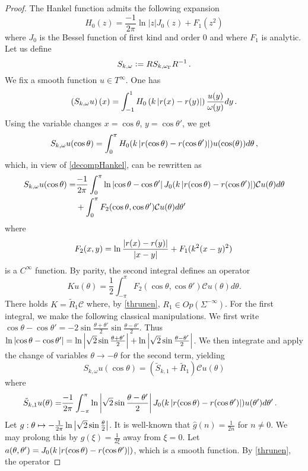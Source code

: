\documentclass[a4paper]{article}
\begin{document}
\begin{proof}
	The Hankel function admits the following expansion
	\begin{equation}
	\label{decompHankel}
	H_0(z) = \frac{-1}{2\pi}\ln|z| J_0(z) + F_1(z^2)
	\end{equation}
	where $J_0$ is the Bessel function of first kind and order $0$ and where $F_1$ is analytic. Let us define 
	\[S_{k,\omega} \mathrel{\mathop:}= R S_{k,\omega_{\Gamma}} R^{-1}\,.\] 
	We fix a smooth function $u \in T^{\infty}$. One has
	\[\left(S_{k,\omega} u\right)(x) = \int_{-1}^1 H_0\left(k\left\lvert r(x) - r(y) \right\rvert\right)\frac{u(y)}{\omega(y)}dy\,.\]
	Using the variable changes $x = \cos\theta$, $y = \cos \theta'$, we get 
	\[ S_{k,\omega} u(\cos \theta) = \int_{0}^\pi H_0(k \left\lvert r(\cos \theta) - r(\cos \theta') \right\rvert) u(\cos(\theta)) d\theta\,,\]
	which, in view of \eqref{decompHankel}, can be rewritten as
	\[\begin{split}
	S_{k,\omega} u(\cos \theta) = &\frac{-1}{2\pi}\int_{0}^\pi \ln \left\lvert \cos \theta - \cos \theta' \right\rvert J_0(k \left\lvert r(\cos \theta) - r(\cos \theta') \right\rvert)\mathcal{C}u(\theta) d\theta \\
	&+ \int_{0}^\pi F_2(\cos\theta,\cos\theta') \mathcal{C}u(\theta) d\theta'
	\end{split}\]
	where 
	\[F_2(x,y) = \ln \frac{\left\lvert r(x)-r(y) \right\rvert}{\left\lvert x-y \right\rvert} + F_1(k^2(x - y)^2)\,\]
	is a $C^\infty$ function. 
	By parity, the second integral defines an operator 
	\[Ku(\theta) = \frac{1}{2} \int_{-\pi}^{\pi} F_2(\cos\theta,\cos\theta') \mathcal{C}u(\theta) d\theta.\]
	There holds $K = \tilde{R}_1\mathcal{C}$ where, by \autoref{thrunen}, $R_1 \in \textit{Op}(\Sigma^{-\infty})$. For the first integral, we make the following classical manipulations. We first write $\cos \theta - \cos\theta' = - 2 \sin \frac{\theta + \theta'}{2}\sin \frac{\theta - \theta'}{2}$. Thus $\ln\left\lvert \cos \theta - \cos\theta' \right\rvert= \ln \left\lvert \sqrt{2} \sin \frac{\theta + \theta'}{2} \right\rvert + \ln \left\lvert \sqrt{2}\sin \frac{\theta - \theta'}{2} \right\rvert$. We then integrate and apply the change of variables $\theta \to - \theta$ for the second term, yielding
	\[S_{k,\omega}u(\cos\theta) = \left(\tilde{S}_{k,1} + \tilde{R}_1 \right)\mathcal{C}u(\theta)\]
	where
	\[\begin{split}
	\tilde{S}_{k,1}u(\theta) = &\frac{-1}{2\pi} \int_{-\pi}^\pi \ln \left\lvert \sqrt{2} \sin \frac{\theta - \theta'}{2} \right\rvert J_0(k\left\lvert r(\cos\theta) - r(\cos \theta') \right\rvert)u(\theta')d\theta'\,.
	\end{split}\]
	Let $g : \theta \mapsto -\frac{1}{2\pi}\ln \left\lvert \sqrt{2} \sin \frac{\theta}{2} \right\rvert$. It is well-known that $\hat{g}(n) = \frac{1}{2n}$ for $n \neq 0$. We may prolong this by $g(\xi) = \frac{1}{2\xi}$ away from $\xi = 0$. Let $a(\theta,\theta') = J_0(k\left\lvert r(\cos \theta ) - r(\cos \theta') \right\rvert)$, which is a smooth function. By \autoref{thrunen}, the operator

\end{proof}
\end{document}
